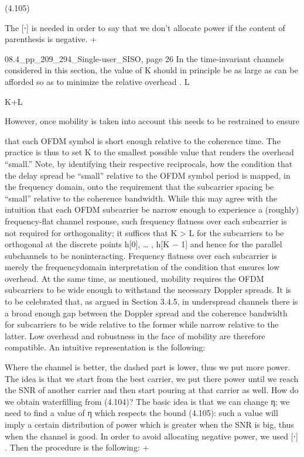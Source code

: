 {{{{{(4.105)

The [⋅] is needed in order to say that we don't allocate power if the content of parenthesis is negative.
+

08.4_pp_209_294_Single-user_SISO, page 26 In the time-invariant channels considered in this section, the value of K should in principle be as large as can be afforded so as to minimize the relative overhead
.
L

K+L

However, once mobility is taken into account this needs to be restrained to ensure

that each OFDM symbol is short enough relative to the coherence time. The practice is thus to set K to the smallest possible value that renders the overhead “small.”
Note, by identifying their respective reciprocals, how the condition that the delay spread be “small” relative to the OFDM symbol period is mapped, in the frequency domain, onto the requirement that the subcarrier spacing be “small” relative to the coherence bandwidth. While this may agree with the intuition that each OFDM subcarrier be narrow enough to experience a (roughly) frequency-flat channel response, such frequency flatness over each subcarrier is not required for orthogonality; it suffices that K > L for the subcarriers to be orthogonal at the discrete points h[0], … , h[K − 1] and hence for the parallel subchannels to be noninteracting. Frequency flatness over each subcarrier is merely the frequencydomain interpretation of the condition that ensures low overhead. At the same time,
as mentioned, mobility requires the OFDM subcarriers to be wide enough to withstand the necessary Doppler spreads. It is to be celebrated that, as argued in Section 3.4.5, in underspread channels there is a broad enough gap between the Doppler spread and the coherence bandwidth for subcarriers to be wide relative to the former while narrow relative to the latter. Low overhead and robustness in the face of mobility are therefore compatible.
An intuitive representation is the following:

Where the channel is better, the dashed part is lower, thus we put more power.
The idea is that we start from the best carrier, we put there power until we reach the SNR of another carrier and then start pouring at that carrier as well.
​How do we obtain waterfilling from (4.104)?
The basic idea is that we can change η; we need to find a value of η which respects the bound (4.105): such a value will imply a certain distribution of power which is greater when the SNR is big, thus when the channel is good. In order to avoid allocating negative power, we used [⋅] .
Then the procedure is the following:
+

}}}}}
